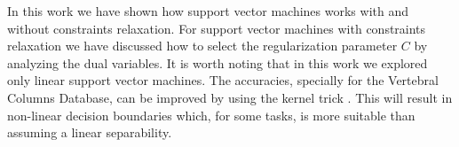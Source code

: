 \label{sec:conclusion}

In this work we have shown how support vector machines works with and without constraints relaxation.
For support vector machines with constraints relaxation we have discussed how to select the regularization parameter $C$ by analyzing the dual variables.
It is worth noting that in this work we explored only linear support vector machines.
The accuracies, specially for the Vertebral Columns Database, can be improved by using the kernel trick \cite{bishop2006pattern}.
This will result in non-linear decision boundaries which, for some tasks, is more suitable than assuming a linear separability.






